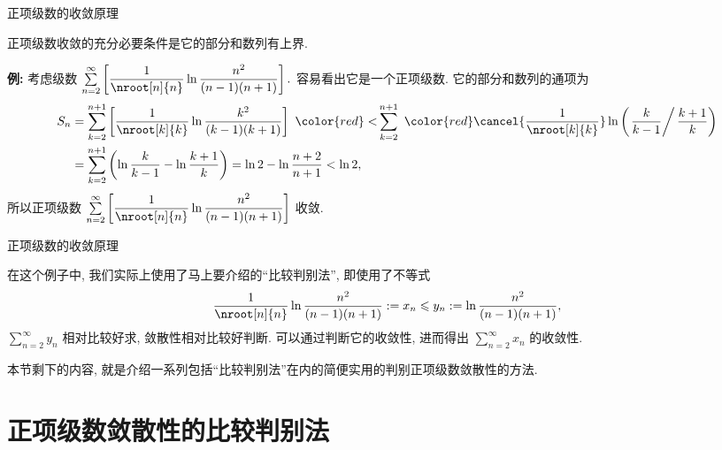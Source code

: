 
\begin{frame}{正项级数的收敛原理}

\begin{thm}[正项级数的收敛原理]
\begin{center}
正项级数收敛的充分必要条件是它的部分和数列有上界.
\end{center}
\end{thm}

\pause
\vspace*{0.4em}

\textbf{例:} 考虑级数 $\sum\limits_{n=2}^\infty \left[ \dfrac{1}{\nroot[n]{n}} \ln{\dfrac{n^2}{(n-1)(n+1)}} \right].$ 容易看出它是一个正项级数.
\pause
它的部分和数列的通项为
\begin{align*}
S_n & = \sum\limits_{k=2}^{n+1} \left[ \dfrac{1}{\nroot[k]{k}} \ln{\dfrac{k^2}{(k-1)(k+1)}} \right] ~ {\color{red}<} \sum\limits_{k=2}^{n+1} ~ {\color{red}\cancel{\dfrac{1}{\nroot[k]{k}}}} \ln{\left( \left.\dfrac{k}{k-1} \right/ \dfrac{k+1}{k} \right)} \\
& = \sum\limits_{k=2}^{n+1} \left( \ln{\dfrac{k}{k-1}} - \ln{\dfrac{k+1}{k}} \right) = \ln{2} - \ln{\dfrac{n+2}{n+1}} < \ln{2},
\end{align*}
所以正项级数 $\sum\limits_{n=2}^\infty \left[ \dfrac{1}{\nroot[n]{n}} \ln{\dfrac{n^2}{(n-1)(n+1)}} \right]$ 收敛.

\end{frame}


\begin{frame}{正项级数的收敛原理}

在这个例子中, 我们实际上使用了马上要介绍的“比较判别法”, 即使用了不等式
\[\dfrac{1}{\nroot[n]{n}} \ln{\dfrac{n^2}{(n-1)(n+1)}} := x_n \leqslant y_n := \ln{\dfrac{n^2}{(n-1)(n+1)}},\]
$\sum\limits_{n=2}^\infty y_n$ 相对比较好求, 敛散性相对比较好判断. 可以通过判断它的收敛性, 进而得出 $\sum\limits_{n=2}^\infty x_n$ 的收敛性.

\pause
\vspace*{1em}

本节剩下的内容, 就是介绍一系列包括“比较判别法”在内的简便实用的判别正项级数敛散性的方法.

\end{frame}


\section[比较判别法]{正项级数敛散性的比较判别法}

